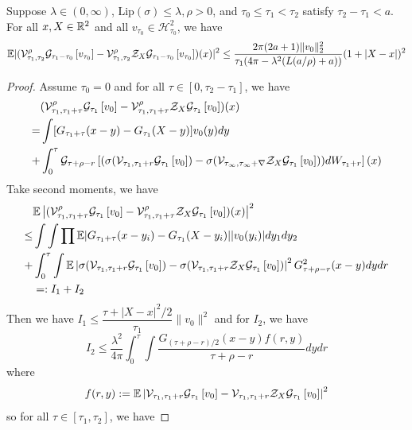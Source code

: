 \begin{proposition}
    Suppose $\lambda \in (0,\infty)$, $\text{Lip}(\sigma) \leq \lambda, \rho > 0$, and $\tau_0 \leq \tau_1 < \tau_2$ satisfy $\tau_2 - \tau_1 < a$. For all $x,X\in \mathbb{R}^2$ and all $v_{\tau_0} \in \mathscr{H}^{2}_{\tau_0}$, we have
    \[
    \mathbb{E}\lvert(\mathcal{V}^{\rho}_{\tau_1,\tau_2}\mathcal{G}_{\tau_1-\tau_0}\left[{v_{\tau_0}}\right] - \mathcal{V}^{\rho}_{\tau_1,\tau_2}\mathcal{Z}_X\mathcal{G}_{\tau_1-\tau_0}\left[{v_{\tau_0}}\right])(x)\rvert^2 \leq \dfrac{2\pi(2a+1)\lVert v_0\rVert_2^2}{\tau_1(4\pi - \lambda^2(L(a/\rho)+a))} (1+|X-x|)^2
    \]
\end{proposition}
\begin{proof}
    Assume $\tau_0 = 0$ and for all $\tau\in[0,\tau_2-\tau_1]$, we have
    \[
    \begin{aligned}
    &(\mathcal{V}^{\rho}_{\tau_1,\tau_1+\tau}\mathcal{G}_{\tau_1}\left[{v_0}\right] - \mathcal{V}^{\rho}_{\tau_1,\tau_1+\tau}\mathcal{Z}_X\mathcal{G}_{\tau_1}\left[{v_0}\right])(x) \\
     =& \int [G_{\tau_1+\tau}(x-y) - G_{\tau_1}(X-y)]v_0(y)dy \\
     +& \int_0^{\tau} \mathcal{G}_{\tau+\rho-r}\left[{(\sigma(\mathcal{V}_{\tau_1,\tau_1+r}\mathcal{G}_{\tau_1}\left[{v_0}\right]) - \sigma(\mathcal{V_{\tau_1,\tau_1+r}}\mathcal{Z}_X \mathcal{G}_{\tau_1}\left[{v_0}\right]))dW_{\tau_1+r}}\right](x)
    \end{aligned}
    \]
    Take second moments, we have
    \[
    \begin{aligned}
    &\mathbb{E}\left|(\mathcal{V}^{\rho}_{\tau_1,\tau_1+\tau}\mathcal{G}_{\tau_1}\left[{v_0}\right] - \mathcal{V}^{\rho}_{\tau_1,\tau_1+\tau}\mathcal{Z}_X\mathcal{G}_{\tau_1}\left[{v_0}\right])(x)\right|^2 \\
     \leq & \int\int \prod\mathbb{E} |G_{\tau_1+\tau}(x-y_i) - G_{\tau_1}(X-y_i)||v_0(y_i)|dy_1dy_2 \\
     +& \int_0^{\tau} \int \mathbb{E}\left|\sigma(\mathcal{V}_{\tau_1,\tau_1+r}\mathcal{G}_{\tau_1}\left[{v_0}\right]) - \sigma(\mathcal{V}_{\tau_1,\tau_1+r}\mathcal{Z}_X \mathcal{G}_{\tau_1}\left[{v_0}\right])\right|^2G_{\tau+\rho-r}^2(x-y)dydr \\
     &=: I_1 + I_2
    \end{aligned}
    \]
    Then we have $I_1 \leq \dfrac{\tau+|X-x|^2/2}{\tau_1}\lVert v_0\rVert^2$ and for $I_2$, we have
    \[
    I_2 \leq \dfrac{\lambda^2}{4\pi} \int_0^{\tau}\int \dfrac{G_{(\tau+\rho-r)/2}(x-y)f(r,y)}{\tau+\rho-r} dydr
    \]
    where
    \[
    f(r,y) : = \mathbb{E}\left|\mathcal{V}_{\tau_1,\tau_1+r}\mathcal{G}_{\tau_1}\left[{v_0}\right] - \mathcal{V}_{\tau_1,\tau_1+r}\mathcal{Z}_X \mathcal{G}_{\tau_1}\left[{v_0}\right]\right|^2
    \]
    so for all $\tau \in [\tau_1,\tau_2]$, we have

\end{proof}
